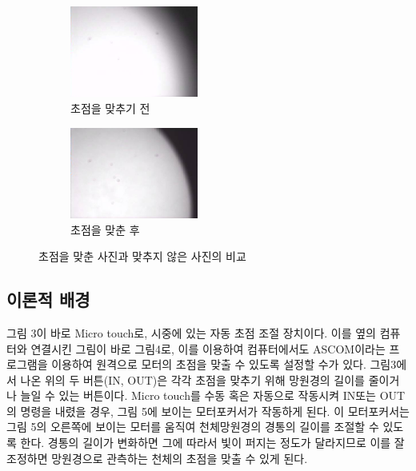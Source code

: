 \documentclass{abstract_hutech}
\begin{document}
\begin{figure}[h]
\begin{subfigure}{0.23\textwidth}
\centering
\includegraphics[width=1\linewidth, height=3cm]{before}
\caption{초점을 맞추기 전}
\label{fig:before}
\end{subfigure}
\begin{subfigure}{0.23\textwidth}
\centering
\includegraphics[width=1\linewidth, height=3cm]{after}
\caption{초점을 맞춘 후}
\label{fig:after}
\end{subfigure}
\caption{초점을 맞춘 사진과 맞추지 않은 사진의 비교}
\end{figure}

\subsection{이론적 배경}

그림 3이 바로 Micro touch로, 시중에 있는 자동 초점 조절 장치이다. 이를 옆의 컴퓨터와 연결시킨 그림이 바로 그림4로, 이를 이용하여 컴퓨터에서도 ASCOM이라는 프로그램을 이용하여 원격으로 모터의 초점을 맞출 수 있도록 설정할 수가 있다. 그림3에서 나온 위의 두 버튼(IN, OUT)은 각각 초점을 맞추기 위해 망원경의 길이를 줄이거나 늘일 수 있는 버튼이다. Micro touch를 수동 혹은 자동으로 작동시켜 IN또는 OUT의 명령을 내렸을 경우, 그림 5에 보이는 모터포커서가 작동하게 된다. 이 모터포커서는 그림 5의 오른쪽에 보이는 모터를 움직여 천체망원경의 경통의 길이를 조절할 수 있도록 한다. 경통의 길이가 변화하면 그에 따라서 빛이 퍼지는 정도가 달라지므로 이를 잘 조정하면 망원경으로 관측하는 천체의 초점을 맞출 수 있게 된다.
\end{document}
